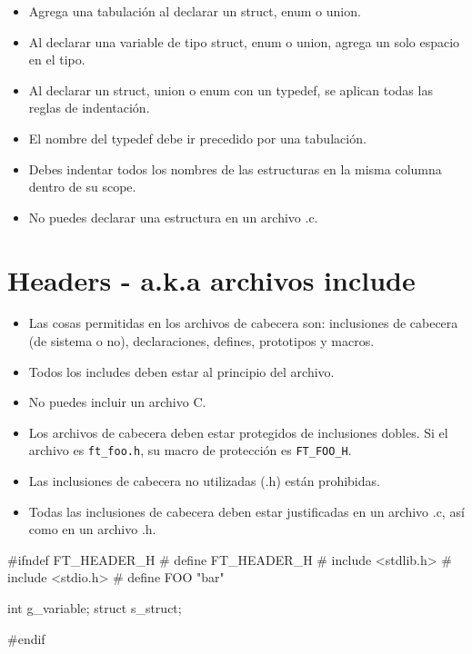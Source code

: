 \documentclass{42-es}
\begin{document}
\begin{itemize}
      \item Agrega una tabulación al declarar un struct, enum o union.
      \item Al declarar una variable de tipo struct, enum o union, agrega un
            solo
            espacio en el tipo.
      \item Al declarar un struct, union o enum con un typedef, se aplican
            todas
            las reglas de indentación.
      \item El nombre del typedef debe ir precedido por una tabulación.
      \item Debes indentar todos los nombres de las estructuras en la misma
            columna dentro de su scope.
      \item No puedes declarar una estructura en un archivo .c.
\end{itemize}
\newpage

\section{Headers - a.k.a archivos include}

\begin{itemize}
      \item Las cosas permitidas en los archivos de cabecera son:
            inclusiones de cabecera (de sistema o no), declaraciones, defines,
            prototipos y macros.
      \item Todos los includes deben estar al principio del archivo.
      \item No puedes incluir un archivo C.
      \item Los archivos de cabecera deben estar protegidos de inclusiones
            dobles. Si el archivo es \texttt{ft\_foo.h}, su macro de protección
            es
            \texttt{FT\_FOO\_H}.
      \item Las inclusiones de cabecera no utilizadas (.h) están prohibidas.
      \item Todas las inclusiones de cabecera deben estar justificadas en un
            archivo .c, así como en un archivo .h.
\end{itemize}

\begin{42ccode}
      #ifndef FT_HEADER_H
      # define FT_HEADER_H
      # include <stdlib.h>
      # include <stdio.h>
      # define FOO "bar"

      int	g_variable;
      struct	s_struct;

      #endif
\end{42ccode}
\newpage
\end{document}
